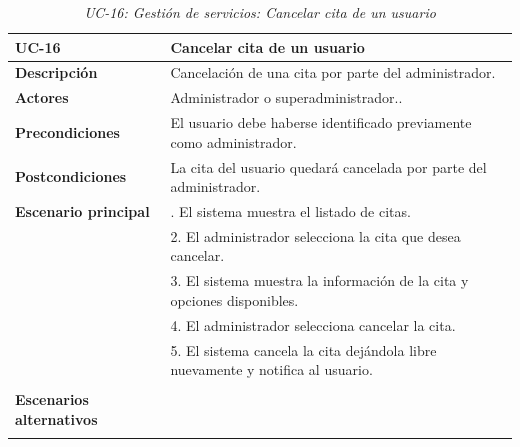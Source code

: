 \begin{table}
  \begin{center}
    \begin{tabularx}{16.4cm}{|l|X|}
      \hline
      \textbf{UC-16} & \textbf{Cancelar cita de un usuario}\\
      \hline
      \textbf{Descripción} & Cancelación de una cita por parte del administrador. \\
      \hline
      \textbf{Actores} & Administrador o superadministrador..\\
      \hline
      \textbf{Precondiciones} & El usuario debe haberse identificado previamente como administrador.\\
      \hline
      \textbf{Postcondiciones} & La cita del usuario quedará cancelada por parte del administrador.\\
      \hline
      \textbf{Escenario principal} & \smallskip 1. El sistema muestra el listado de citas.\\
      & 2. El administrador selecciona la cita que desea cancelar.\\
      & 3. El sistema muestra la información de la cita y opciones disponibles.\\
      & 4. El administrador selecciona cancelar la cita.\\
      & 5. El sistema cancela la cita dejándola libre nuevamente y notifica al usuario.\\
      & \\
      \hline
      \textbf{Escenarios alternativos} & \\
      & \\
      \hline
    \end{tabularx}
    \caption{\textit{UC-16: Gestión de servicios: Cancelar cita de un usuario}}
    \label{tab:CU-cancelar-cita-admin}
  \end{center}
\end{table}


